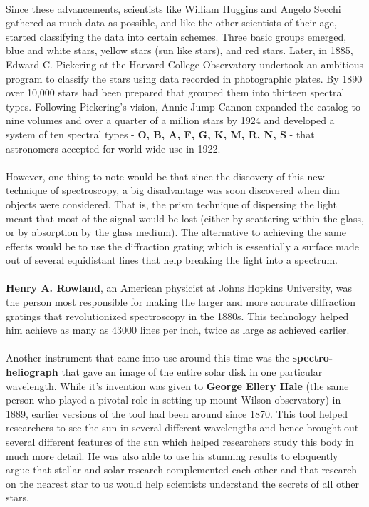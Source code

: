 \documentclass[a4paper,twoside]{article}
\numberwithin{equation}{section}
\begin{document}
\paragraph{}
Since these advancements, scientists like William Huggins and Angelo Secchi gathered as much data as possible, and like the other scientists of their age, started classifying the data into certain schemes. Three basic groups emerged, blue and white stars, yellow stars (sun like stars), and red stars. Later, in 1885, Edward C. Pickering at the Harvard College Observatory undertook an ambitious program to classify the stars using data recorded in photographic plates. By 1890 over 10,000 stars had been prepared that grouped them into thirteen spectral types. Following Pickering's vision, Annie Jump Cannon expanded the catalog to nine volumes and over a quarter of a million stars by 1924 and developed a system of ten spectral types - \textbf{O, B, A, F, G, K, M, R, N, S} - that astronomers accepted for world-wide use in 1922. 
\paragraph{}
However, one thing to note would be that since the discovery of this new technique of spectroscopy, a big disadvantage was soon discovered when dim objects were considered. That is, the prism technique of dispersing the light meant that most of the signal would be lost (either by scattering within the glass, or by absorption by the glass medium). The alternative to achieving the same effects would be to use the diffraction grating which is essentially a surface made out of several equidistant lines that help breaking the light into a spectrum. 
\paragraph{}
\textbf{Henry A. Rowland}, an American physicist at Johns Hopkins University, was the person most responsible for making the larger and more accurate diffraction gratings that revolutionized spectroscopy in the 1880s. This technology helped him achieve as many as 43000 lines per inch, twice as large as achieved earlier. 
\paragraph{}
Another instrument that came into use around this time was the \textbf{spectro-heliograph} that gave an image of the entire solar disk in one particular wavelength. While it's invention was given to \textbf{George Ellery Hale} (the same person who played a pivotal role in setting up mount Wilson observatory) in 1889, earlier versions of the tool had been around since 1870. This tool helped researchers to see the sun in several different wavelengths and hence brought out several different features of the sun which helped researchers study this body in much more detail. He was also able to use his stunning results to eloquently argue that stellar and solar research complemented each other and that research on the nearest star to us would help scientists understand the secrets of all other stars. 
\end{document}
